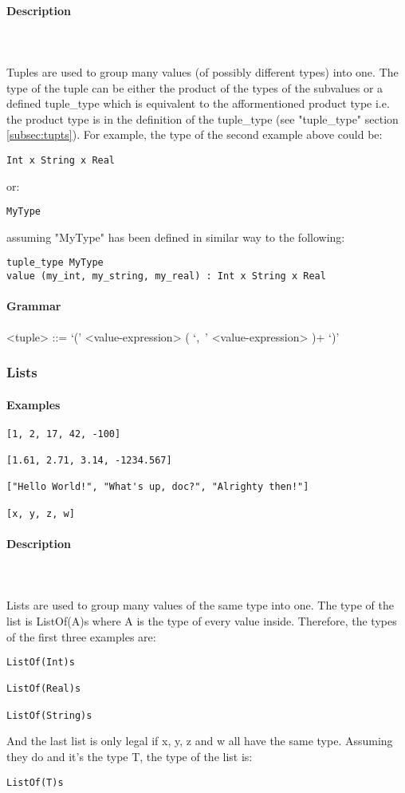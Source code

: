 \documentclass{article}
\def\pend{\mbox{} \\\\}
\begin{document}
\paragraph{Description}\pend
Tuples are used to group many values (of possibly different types) into one.
The type of the tuple can be either the product of the types of the subvalues or a
defined tuple\_type which is equivalent to the afformentioned product type i.e.
the product type is in the definition of the tuple\_type (see "tuple\_type"
section \ref{subsec:tupts}). For example, the type of the second example above 
could be:
\begin{verbatim}
Int x String x Real
\end{verbatim}
or:
\begin{verbatim}
MyType
\end{verbatim}
assuming "MyType" has been defined in similar way to the following:
\begin{verbatim}
tuple_type MyType
value (my_int, my_string, my_real) : Int x String x Real
\end{verbatim}


\paragraph{Grammar}
\begin{grammar}
<tuple> ::= `(' <value-expression> ( `,\ ' <value-expression> )+ `)'
\end{grammar}

\subsubsection{Lists}

\paragraph{Examples}

\begin{verbatim}
[1, 2, 17, 42, -100]

[1.61, 2.71, 3.14, -1234.567]

["Hello World!", "What's up, doc?", "Alrighty then!"]

[x, y, z, w]
\end{verbatim}

\paragraph{Description}\pend
Lists are used to group many values of the same type into one. 
The type of the list is ListOf(A)s where A is the type of every value inside.
Therefore, the types of the first three examples are:
\begin{verbatim}
ListOf(Int)s

ListOf(Real)s

ListOf(String)s
\end{verbatim}
And the last list is only legal if x, y, z and w all have the same type. Assuming 
they do and it's the type T, the type of the list is: 
\begin{verbatim}
ListOf(T)s
\end{verbatim}
\end{document}

